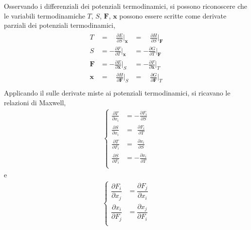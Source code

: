 \documentclass[letterpaper,10pt,english]{jupyterBook}
\begin{document}
\sphinxAtStartPar
{} Osservando i differenziali dei potenziali termodinamici, si possono riconoscere che le variabili termodinamiche \(T\), \(S\), \(\mathbf{F}\), \(\mathbf{x}\) possono essere scritte come derivate parziali dei potenziali termodinamici,
\begin{equation*}
\begin{split}\begin{aligned}
 T & = \quad \frac{\partial E}{\partial S}\Big|_{\mathbf{x}} & = \quad \frac{\partial H}{\partial S}\Big|_{\mathbf{F}} \\
 S & =     - \frac{\partial F}{\partial T}\Big|_{\mathbf{x}} & =     - \frac{\partial G}{\partial T}\Big|_{\mathbf{F}} \\
 \mathbf{F} & =     - \frac{\partial E}{\partial \mathbf{x}}\Big|_{S} & = - \frac{\partial F}{\partial \mathbf{x}}\Big|_{T} \\
 \mathbf{x} & = \quad \frac{\partial H}{\partial \mathbf{F}}\Big|_{S} & = \quad \frac{\partial G}{\partial \mathbf{F}}\Big|_{T}\\
\end{aligned}\end{split}
\end{equation*}
\sphinxAtStartPar
{} Applicando il  sulle derivate miste ai potenziali termodinamici, si ricavano le relazioni di Maxwell,
\begin{equation*}
\begin{split}\begin{cases}
 \frac{\partial T}{\partial x_i} & =   - \frac{\partial F_i}{\partial S} \\
 \frac{\partial S}{\partial x_i} & = \ \ \frac{\partial F_i}{\partial T} \\
 \frac{\partial T}{\partial F_i} & = \ \ \frac{\partial x_i}{\partial S} \\
 \frac{\partial S}{\partial F_i} & =   - \frac{\partial x_i}{\partial T} \\
\end{cases}\end{split}
\end{equation*}
\sphinxAtStartPar
e
\begin{equation*}
\begin{split}\begin{cases}
 \dfrac{\partial F_i}{\partial x_j} & =  \dfrac{\partial F_j}{\partial x_i} \\
 \dfrac{\partial x_i}{\partial F_j} & =  \dfrac{\partial x_j}{\partial F_i} \\
\end{cases}\end{split}
\end{equation*}
\sphinxstepscope
\end{document}

